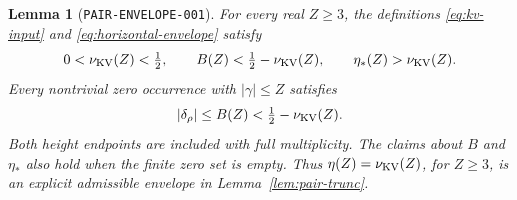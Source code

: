 \documentclass[11pt]{article}
\newtheorem{lemma}{Lemma}
\begin{document}
\begin{lemma}[\texttt{PAIR-ENVELOPE-001}]\label{lem:pair-envelope}
For every real \(Z\geq3\), the definitions
\eqref{eq:kv-input} and \eqref{eq:horizontal-envelope} satisfy
\begin{equation}\label{eq:finite-height-envelope}
 0<\nu_{\rm KV}(Z)<\tfrac12,\qquad
 B(Z)<\tfrac12-\nu_{\rm KV}(Z),\qquad
 \eta_*(Z)>\nu_{\rm KV}(Z).
\end{equation}
Every nontrivial zero occurrence with \(|\gamma|\leq Z\) satisfies
\begin{equation}\label{eq:two-sided-envelope}
 |\delta_\rho|\leq B(Z)<\tfrac12-\nu_{\rm KV}(Z).
\end{equation}
Both height endpoints are included with full multiplicity. The claims
about \(B\) and \(\eta_*\) also hold when the finite zero set is empty.
Thus \(\eta(Z)=\nu_{\rm KV}(Z)\), for \(Z\geq3\), is an explicit
admissible envelope in Lemma~\ref{lem:pair-trunc}.
\end{lemma}
\end{document}
